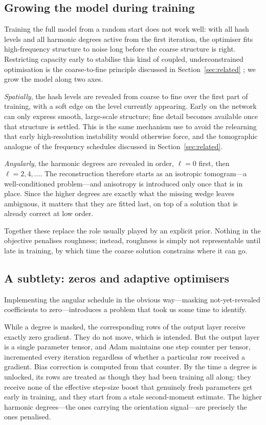 \documentclass[11pt,a4paper]{article}
\begin{document}
\subsection{Growing the model during training}
\label{sec:annealing}

Training the full model from a random start does not work well: with all hash levels and
all harmonic degrees active from the first iteration, the optimiser fits high-frequency
structure to noise long before the coarse structure is right. Restricting capacity early
to stabilise this kind of coupled, underconstrained optimisation is the coarse-to-fine
principle discussed in Section~\ref{sec:related} \citep{Lin2021barf,Yang2023}; we grow the
model along two axes.

\emph{Spatially}, the hash levels are revealed from coarse to fine over the first part of
training, with a soft edge on the level currently appearing. Early on the network can only
express smooth, large-scale structure; fine detail becomes available once that structure is
settled. This is the same mechanism \citet{Li2023neuralangelo} use to avoid the relearning
that early high-resolution instability would otherwise force, and the tomographic analogue
of the frequency schedules discussed in Section~\ref{sec:related}.

\emph{Angularly}, the harmonic degrees are revealed in order, $\ell=0$ first, then
$\ell=2,4,\dots$. The reconstruction therefore starts as an isotropic tomogram---a
well-conditioned problem---and anisotropy is introduced only once that is in place. Since
the higher degrees are exactly what the missing wedge leaves ambiguous, it matters that
they are fitted last, on top of a solution that is already correct at low order.

Together these replace the role usually played by an explicit prior. Nothing in the
objective penalises roughness; instead, roughness is simply not representable until late
in training, by which time the coarse solution constrains where it can go.

\subsection{A subtlety: zeros and adaptive optimisers}
\label{sec:stochastic}

Implementing the angular schedule in the obvious way---masking not-yet-revealed
coefficients to zero---introduces a problem that took us some time to identify.

While a degree is masked, the corresponding rows of the output layer receive exactly zero
gradient. They do not move, which is intended. But the output layer is a single parameter
tensor, and Adam \citep{Kingma2015} maintains one step counter per tensor, incremented
every iteration regardless of whether a particular row received a gradient. Bias
correction is computed from that counter. By the time a degree is unlocked, its rows are
treated as though they had been training all along: they receive none of the effective
step-size boost that genuinely fresh parameters get early in training, and they start from
a stale second-moment estimate. The higher harmonic degrees---the ones carrying the
orientation signal---are precisely the ones penalised.
\end{document}
